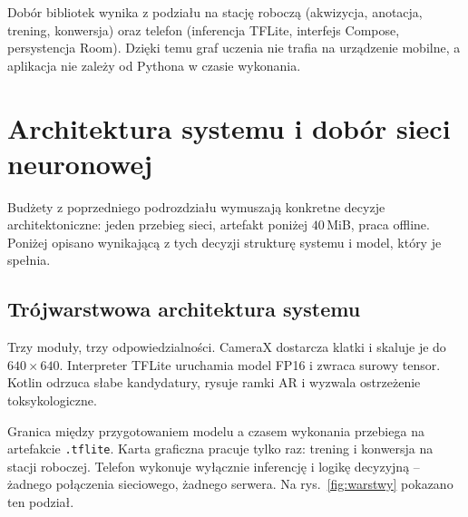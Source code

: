 Dobór bibliotek wynika z podziału na stację roboczą (akwizycja, anotacja, trening, konwersja) oraz telefon (inferencja TFLite, interfejs Compose, persystencja Room). Dzięki temu graf uczenia nie trafia na urządzenie mobilne, a aplikacja nie zależy od Pythona w czasie wykonania.

\section{Architektura systemu i dobór sieci neuronowej}
Budżety z poprzedniego podrozdziału wymuszają konkretne decyzje architektoniczne: jeden przebieg sieci, artefakt poniżej $40$\,MiB, praca offline. Poniżej opisano wynikającą z tych decyzji strukturę systemu i model, który je spełnia.

\subsection{Trójwarstwowa architektura systemu}
Trzy moduły, trzy odpowiedzialności. CameraX dostarcza klatki i skaluje je do $640\times640$. Interpreter TFLite uruchamia model FP16 i zwraca surowy tensor. Kotlin odrzuca słabe kandydatury, rysuje ramki AR i wyzwala ostrzeżenie toksykologiczne.

Granica między przygotowaniem modelu a czasem wykonania przebiega na artefakcie \texttt{.tflite}. Karta graficzna pracuje tylko raz: trening i konwersja na stacji roboczej. Telefon wykonuje wyłącznie inferencję i logikę decyzyjną -- żadnego połączenia sieciowego, żadnego serwera. Na rys.~\ref{fig:warstwy} pokazano ten podział.

